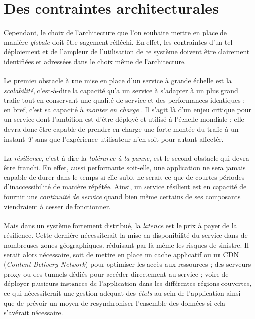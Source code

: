 \section{Des contraintes architecturales}

\paragraph{} Cependant, le choix de l'architecture que l'on souhaite mettre en place de manière \emph{globale} doit 
être sagement réfléchi. En effet, les contraintes d'un tel déploiement et de l'ampleur de l'utilisation de ce système
doivent être clairement identifiées et adressées dans le choix même de l'architecture.

\paragraph{} Le premier obstacle à une mise en place d'un service à grande échelle est la \emph{scalabilité}, c'est-à-dire
la capacité qu'a un service à s'adapter à un plus grand trafic tout en conservant une qualité de service et des performances
identiques ; en bref, c'est sa capacité à \emph{monter en charge} \cite{Scalability0}. Il s'agit là d'un enjeu critique pour
un service dont l'ambition est d'être déployé et utilisé à l'échelle mondiale ; elle devra donc être capable de prendre en
charge une forte montée du trafic à un instant \emph{T} sans que l'expérience utilisateur n'en soit pour autant affectée.

\paragraph{} La \emph{résilience}, c'est-à-dire la \emph{tolérance à la panne}, est le second obstacle qui devra être franchi.
En effet, aussi performante soit-elle, une application ne sera jamais capable de durer dans le temps si elle subit ne serait-ce
que de courtes périodes d'inaccessibilité de manière répétée. Ainsi, un service résilient est en capacité de fournir une
\emph{continuité de service} quand bien même certains de ses composants viendraient à cesser de fonctionner.

\paragraph{} Mais dans un système fortement distribué, la \emph{latence} est le prix à payer de la résilience. Cette dernière nécessiterait
la mise en disponibilité du service dans de nombreuses zones géographiques, réduisant par là même les risques de sinistre. Il serait alors
nécessaire, soit de mettre en place un cache applicatif ou un CDN (\emph{Content Delivery Network}) pour optimiser les 
accès aux ressources ; des serveurs proxy ou des tunnels dédiés pour accéder directement au service ; voire de déployer plusieurs
instances de l'application dans les différentes régions couvertes, ce qui nécessiterait une gestion adéquat des \emph{états}
au sein de l'application ainsi que de prévoir un moyen de resynchroniser l'ensemble des données si cela s'avérait nécessaire.

